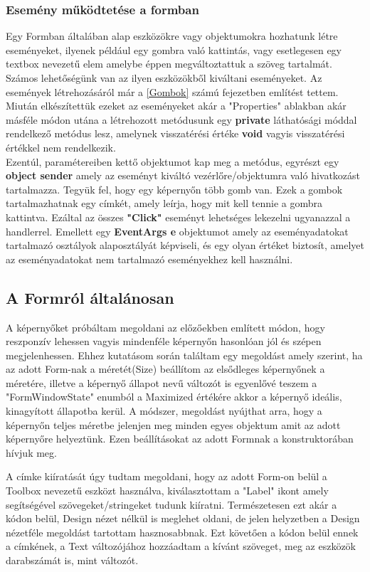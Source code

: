 \documentclass[tocnopagenum]{thesis-ekf}
\theoremstyle{definition}
\theoremstyle{remark}
\begin{document}
	\subsubsection{Esemény működtetése a formban}
	\label{esemenyformban}
	Egy Formban általában alap eszközökre vagy objektumokra hozhatunk létre eseményeket, ilyenek például egy gombra való kattintás, vagy esetlegesen egy textbox nevezetű elem amelybe éppen megváltoztattuk a szöveg tartalmát.
	Számos lehetőségünk van az ilyen eszközökből kiváltani eseményeket.
	Az események létrehozásáról már a \ref{Gombok} számú fejezetben említést tettem.
	Miután elkészítettük ezeket az eseményeket akár a "Properties" ablakban akár másféle módon utána a létrehozott metódusunk egy \textbf{private} láthatósági móddal rendelkező metódus lesz, amelynek visszatérési értéke \textbf{void} vagyis visszatérési értékkel nem rendelkezik. 
	\\
	Ezentúl, paramétereiben kettő objektumot kap meg a metódus, egyrészt egy \textbf{object sender} amely az eseményt kiváltó vezérlőre/objektumra való hivatkozást tartalmazza. Tegyük fel, hogy egy képernyőn több gomb van. Ezek a gombok tartalmazhatnak egy címkét, amely leírja, hogy mit kell tennie a gombra kattintva. Ezáltal az összes \textbf{"Click"} eseményt lehetséges lekezelni ugyanazzal a handlerrel.
	Emellett egy \textbf{EventArgs e} objektumot amely az eseményadatokat tartalmazó osztályok alaposztályát képviseli, és egy olyan értéket biztosít, amelyet az eseményadatokat nem tartalmazó eseményekhez kell használni. 
	\cite{eventobjargs}
	
	\subsection{A Formról általánosan}
	A képernyőket próbáltam megoldani az előzőekben említett módon, hogy reszponzív lehessen vagyis mindenféle képernyőn hasonlóan jól és szépen megjelenhessen. Ehhez kutatásom során találtam egy megoldást amely szerint, ha az adott Form-nak a méretét(Size) beállítom az elsődleges képernyőnek a méretére, illetve a képernyő állapot nevű változót is egyenlővé teszem a "FormWindowState" enumból a Maximized értékére akkor a képernyő ideális, kinagyított állapotba kerül. A módszer, megoldást nyújthat arra, hogy a képernyőn teljes méretbe jelenjen meg minden egyes objektum amit az adott képernyőre helyeztünk. Ezen beállításokat az adott Formnak a konstruktorában hívjuk meg.

	A címke kiíratását úgy tudtam megoldani, hogy az adott Form-on belül a Toolbox nevezetű eszközt használva, kiválasztottam a "Label" ikont amely segítségével szövegeket/stringeket tudunk kiíratni. Természetesen ezt akár a kódon belül, Design nézet nélkül is meglehet oldani, de jelen helyzetben a Design nézetféle megoldást tartottam hasznosabbnak. Ezt követően a kódon belül ennek a címkének, a Text változójához hozzáadtam a kívánt szöveget, meg az eszközök darabszámát is, mint változót.
\end{document}
